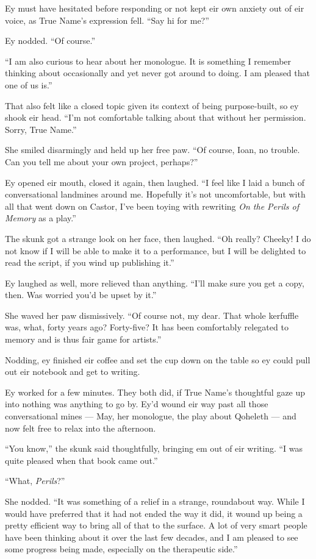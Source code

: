 Ey must have hesitated before responding or not kept eir own anxiety out of eir voice, as True Name's expression fell. ``Say hi for me?''

Ey nodded. ``Of course.''

``I am also curious to hear about her monologue. It is something I remember thinking about occasionally and yet never got around to doing. I am pleased that one of us is.''

That also felt like a closed topic given its context of being purpose-built, so ey shook eir head. ``I'm not comfortable talking about that without her permission. Sorry, True Name.''

She smiled disarmingly and held up her free paw. ``Of course, Ioan, no trouble. Can you tell me about your own project, perhaps?''

Ey opened eir mouth, closed it again, then laughed. ``I feel like I laid a bunch of conversational landmines around me. Hopefully it's not uncomfortable, but with all that went down on Castor, I've been toying with rewriting \emph{On the Perils of Memory} as a play.''

The skunk got a strange look on her face, then laughed. ``Oh really? Cheeky! I do not know if I will be able to make it to a performance, but I will be delighted to read the script, if you wind up publishing it.''

Ey laughed as well, more relieved than anything. ``I'll make sure you get a copy, then. Was worried you'd be upset by it.''

She waved her paw dismissively. ``Of course not, my dear. That whole kerfuffle was, what, forty years ago? Forty-five? It has been comfortably relegated to memory and is thus fair game for artists.''

Nodding, ey finished eir coffee and set the cup down on the table so ey could pull out eir notebook and get to writing.

Ey worked for a few minutes. They both did, if True Name's thoughtful gaze up into nothing was anything to go by. Ey'd wound eir way past all those conversational mines — May, her monologue, the play about Qoheleth — and now felt free to relax into the afternoon.

``You know,'' the skunk said thoughtfully, bringing em out of eir writing. ``I was quite pleased when that book came out.''

``What, \emph{Perils}?''

She nodded. ``It was something of a relief in a strange, roundabout way. While I would have preferred that it had not ended the way it did, it wound up being a pretty efficient way to bring all of that to the surface. A lot of very smart people have been thinking about it over the last few decades, and I am pleased to see some progress being made, especially on the therapeutic side.''

